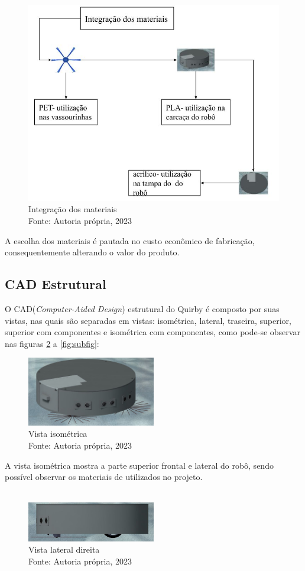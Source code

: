  \begin{figure}[h]
\begin{center}
\includegraphics[height=6 cm, width=14 cm]{figuras/intemat.jpg}
\caption{Integração dos materiais\\Fonte: Autoria própria, 2023}
\label{tampa}
\end{center}
\end{figure}
A escolha dos materiais é pautada no custo econômico de fabricação, consequentemente alterando o valor do produto.
\newpage
\pagebreak
 
\subsection{CAD Estrutural}
O CAD(\textit{Computer-Aided Design}) estrutural do Quirby é composto por suas vistas, nas quais são separadas em vistas: isométrica, lateral, traseira, superior, superior com componentes e isométrica com componentes, como pode-se observar nas figuras \ref{vistaFrontal} a \ref{fig:subfig}:
\\

\begin{figure}[h!]
\centering
\includegraphics[width=0.5\textwidth]{figuras/frontal.jpg}
\caption{Vista isométrica\\Fonte: Autoria própria, 2023}
\label{vistaFrontal}
\end{figure}
 A vista isométrica mostra a parte superior frontal e lateral do robô, sendo possível observar os materiais de utilizados no projeto.
\\
\\
\begin{figure}[h!]
\centering
\includegraphics[width=0.5\textwidth]{figuras/direita.jpg}
\caption{Vista lateral direita\\Fonte: Autoria própria, 2023}
\label{vistaLateral}
\end{figure}


